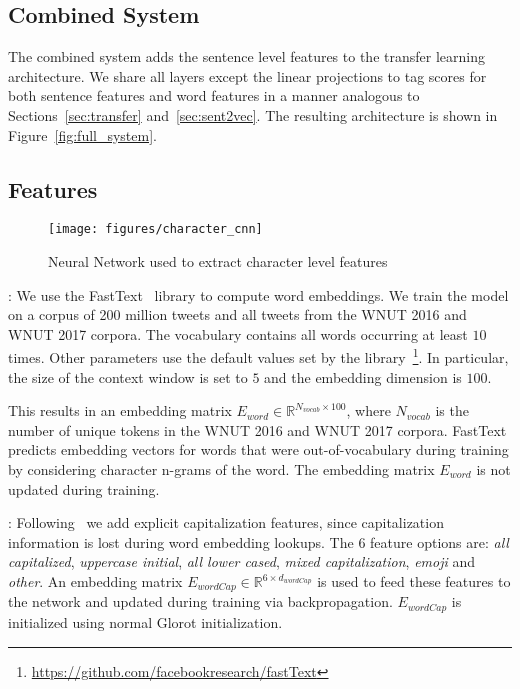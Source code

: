\documentclass[11pt,letterpaper]{article}
\begin{document}
\subsection{Combined System}
\label{sec:combined}

The combined system adds the sentence level features to the transfer learning
architecture. We share all layers except the linear projections to tag scores
for both sentence features and word features in a manner analogous to
Sections~\ref{sec:transfer} and~\ref{sec:sent2vec}. The resulting
architecture is shown in Figure~\ref{fig:full_system}.

\subsection{Features}
\label{sec:features}

\begin{figure}
    \texttt{[image: figures/character\_cnn]}
    \caption{Neural Network used to extract character level features}\label{fig:character_cnn}
\end{figure}

: We use the FastText~\cite{fasttext} library
to compute word embeddings. We train the model on a corpus of 200 million
tweets and all tweets from the WNUT 2016 and WNUT 2017 corpora.
The vocabulary contains all words occurring at least $10$ times. Other parameters
use the default values set by the library~\footnote{\url{https://github.com/facebookresearch/fastText}}.
In particular, the size of the context window is set to $5$ and the embedding
dimension is $100$.

This results in an embedding matrix $E_{word} \in \mathbb{R}^{N_{vocab} \times 100}$,
where $N_{vocab}$ is the number of unique tokens in the WNUT 2016 and WNUT 2017
corpora. FastText predicts embedding vectors for words that were out-of-vocabulary
during training by considering character n-grams of the word. The embedding
matrix $E_{word}$ is not updated during training.

: Following~\cite{ner_lstm_cnn}
we add explicit capitalization features, since capitalization information is
lost during word embedding lookups. The $6$ feature options are: \textit{all capitalized},
\textit{uppercase initial}, \textit{all lower cased}, \textit{mixed capitalization},
\textit{emoji} and \textit{other}. An embedding matrix $E_{wordCap} \in \mathbb{R}^{6 \times d_{wordCap}}$
is used to feed these features to the network and updated during training via
backpropagation. $E_{wordCap}$ is initialized using normal Glorot initialization.
\end{document}
